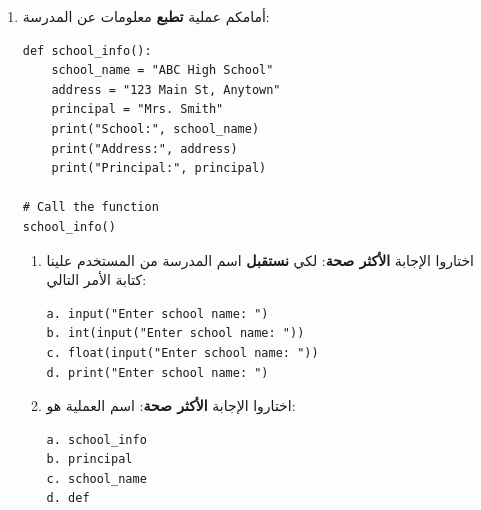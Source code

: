 \documentclass[14pt]{extarticle}
\begin{document}
\begin{enumerate}[label=\textbf{تمرين \arabic*:}, wide=0pt, itemsep=2.2em]
\begin{boxSolution}
\begin{english}
\begin{verbatim}
    # Calculate the total price
    total_price = num_pizzas * price_per_pizza

    # Display the result
    print("The total price for pizzas is:", total_price, "nis")

# Call the function
calculate_pizza_order()
\end{verbatim}
\end{english}
\end{boxSolution}

\fi

\filbreak
\item أمامكم عملية \textbf{تطبع} معلومات عن المدرسة:

\begin{boxCode}
\begin{english}
\begin{verbatim}
def school_info():
    school_name = "ABC High School"
    address = "123 Main St, Anytown"
    principal = "Mrs. Smith"
    print("School:", school_name)
    print("Address:", address)
    print("Principal:", principal)

# Call the function
school_info()
\end{verbatim}
\end{english}
\end{boxCode}

\begin{enumerate}[leftmargin=*, itemsep=1.2em]
\item[\textbf{أ.}] اختاروا الإجابة \textbf{الأكثر صحة}: لكي \textbf{نستقبل} اسم المدرسة من المستخدم علينا كتابة الأمر التالي:
\begin{boxCode}
\begin{english}
\begin{verbatim}
a. input("Enter school name: ")
b. int(input("Enter school name: "))
c. float(input("Enter school name: "))
d. print("Enter school name: ")
\end{verbatim}
\end{english}
\end{boxCode}

\item[\textbf{ب.}] اختاروا الإجابة \textbf{الأكثر صحة}: اسم العملية هو:
\begin{boxCode}
\begin{english}
\begin{verbatim}
a. school_info
b. principal
c. school_name
d. def
\end{verbatim}
\end{english}
\end{boxCode}


\end{enumerate}
\end{enumerate}
\end{document}
